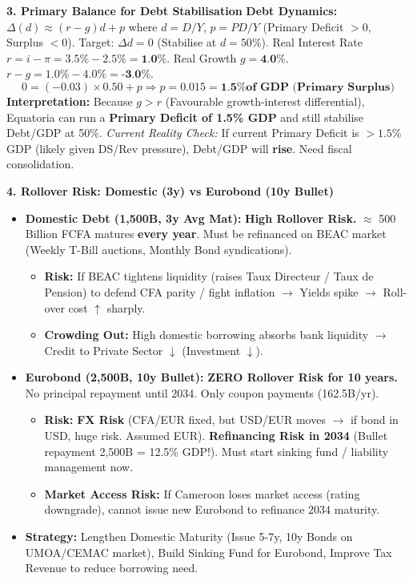 \documentclass[11pt]{article}
\begin{document}
\begin{exoresolu}
\textbf{3. Primary Balance for Debt Stabilisation}
\textbf{Debt Dynamics:} $\Delta (d) \approx (r - g) d + p$ where $d = D/Y$, $p = PD/Y$ (Primary Deficit $>0$, Surplus $<0$).
Target: $\Delta d = 0$ (Stabilise at $d=50\%$).
Real Interest Rate $r = i - \pi = 3.5\% - 2.5\% = \textbf{1.0\%}$.
Real Growth $g = \textbf{4.0\%}$.
$r - g = 1.0\% - 4.0\% = \textbf{-3.0\%}$.
\[
0 = (-0.03) \times 0.50 + p \Rightarrow p = 0.015 = \textbf{1.5\% of GDP (Primary Surplus)}
\]
\textbf{Interpretation:} Because $g > r$ (Favourable growth-interest differential), Equatoria can run a \textbf{Primary Deficit of 1.5\% GDP} and still stabilise Debt/GDP at 50\%. 
\textit{Current Reality Check:} If current Primary Deficit is $> 1.5\%$ GDP (likely given DS/Rev pressure), Debt/GDP will \textbf{rise}. Need fiscal consolidation.

\textbf{4. Rollover Risk: Domestic (3y) vs Eurobond (10y Bullet)}
\begin{itemize}
    \item \textbf{Domestic Debt (1,500B, 3y Avg Mat):} \textbf{High Rollover Risk.} $\approx$ 500 Billion FCFA matures \textbf{every year}. Must be refinanced on BEAC market (Weekly T-Bill auctions, Monthly Bond syndications). 
    \begin{itemize}
        \item \textbf{Risk:} If BEAC tightens liquidity (raises Taux Directeur / Taux de Pension) to defend CFA parity / fight inflation $\rightarrow$ Yields spike $\rightarrow$ Roll-over cost $\uparrow$ sharply. 
        \item \textbf{Crowding Out:} High domestic borrowing absorbs bank liquidity $\rightarrow$ Credit to Private Sector $\downarrow$ (Investment $\downarrow$).
    \end{itemize}
    \item \textbf{Eurobond (2,500B, 10y Bullet):} \textbf{ZERO Rollover Risk for 10 years.} No principal repayment until 2034. Only coupon payments (162.5B/yr). 
    \begin{itemize}
        \item \textbf{Risk:} \textbf{FX Risk} (CFA/EUR fixed, but USD/EUR moves $\rightarrow$ if bond in USD, huge risk. Assumed EUR). \textbf{Refinancing Risk in 2034} (Bullet repayment 2,500B = 12.5\% GDP!). Must start sinking fund / liability management now.
        \item \textbf{Market Access Risk:} If Cameroon loses market access (rating downgrade), cannot issue new Eurobond to refinance 2034 maturity.
    \end{itemize}
    \item \textbf{Strategy:} Lengthen Domestic Maturity (Issue 5-7y, 10y Bonds on UMOA/CEMAC market), Build Sinking Fund for Eurobond, Improve Tax Revenue to reduce borrowing need.
\end{itemize}
\end{exoresolu}
\end{document}
